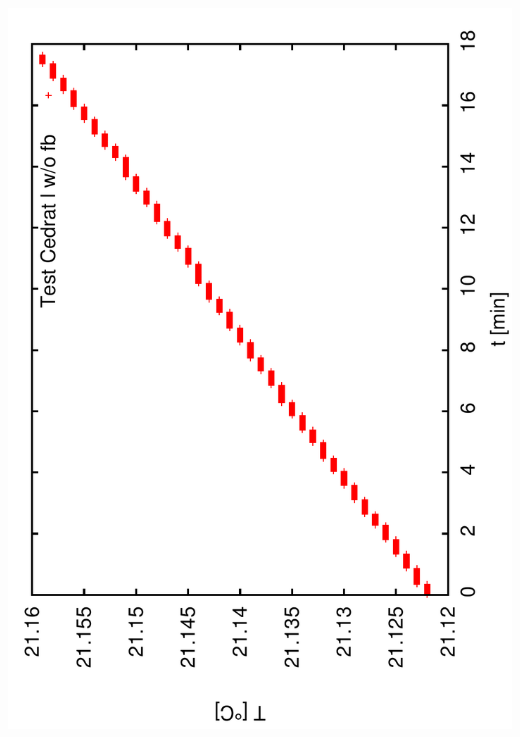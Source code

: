 \documentclass[a4paper,11pt]{book}
\begin{document}
\includegraphics[angle=-90,scale=0.15]{image71a.pdf}\\
\end{document}
